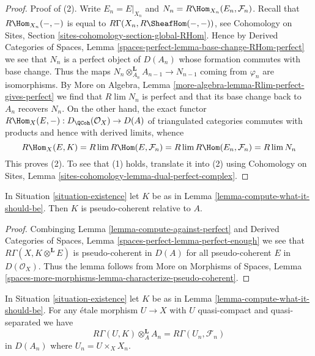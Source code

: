 \begin{proof}
Proof of (2). Write $E_n = E|_{X_n}$ and
$N_n = R\Hom_{X_n}(E_n, \mathcal{F}_n)$.
Recall that $R\Hom_{X_n}(-, -)$ is equal to
$R\Gamma(X_n, R\SheafHom(-, -))$, see
Cohomology on Sites, Section \ref{sites-cohomology-section-global-RHom}.
Hence by Derived Categories of Spaces, Lemma
\ref{spaces-perfect-lemma-base-change-RHom-perfect}
we see that $N_n$ is a perfect object of $D(A_n)$
whose formation commutes with base change. Thus the maps
$N_n \otimes_{A_n}^\mathbf{L} A_{n - 1} \to N_{n - 1}$
coming from $\varphi_n$ are isomorphisms.
By More on Algebra, Lemma \ref{more-algebra-lemma-Rlim-perfect-gives-perfect}
we find that $R\lim N_n$ is perfect and
that its base change back to $A_n$ recovers $N_n$.
On the other hand, the exact functor
$R\Hom_X(E, -) : D_\QCoh(\mathcal{O}_X) \to D(A)$
of triangulated categories commutes with products
and hence with derived limits, whence
$$
R\Hom_X(E, K) =
R\lim R\Hom(E, \mathcal{F}_n) =
R\lim R\Hom(E_n, \mathcal{F}_n) =
R\lim N_n
$$
This proves (2). To see that (1) holds, translate it into (2)
using Cohomology on Sites, Lemma
\ref{sites-cohomology-lemma-dual-perfect-complex}.
\end{proof}

\begin{lemma}
\label{lemma-relative-pseudo-coherence}
In Situation \ref{situation-existence} let $K$ be as in
Lemma \ref{lemma-compute-what-it-should-be}. Then $K$
is pseudo-coherent relative to $A$.
\end{lemma}

\begin{proof}
Combinging Lemma \ref{lemma-compute-against-perfect} and
Derived Categories of Spaces, Lemma \ref{spaces-perfect-lemma-perfect-enough}
we see that $R\Gamma(X, K \otimes^\mathbf{L} E)$
is pseudo-coherent in $D(A)$ for all pseudo-coherent
$E$ in $D(\mathcal{O}_X)$. Thus the lemma follows from
More on Morphisms of Spaces, Lemma
\ref{spaces-more-morphisms-lemma-characterize-pseudo-coherent}.
\end{proof}

\begin{lemma}
\label{lemma-compute-over-affine}
In Situation \ref{situation-existence} let $K$ be as in
Lemma \ref{lemma-compute-what-it-should-be}. For any
\'etale morphism $U \to X$ with $U$ quasi-compact and quasi-separated we have
$$
R\Gamma(U, K) \otimes_A^\mathbf{L} A_n =
R\Gamma(U_n, \mathcal{F}_n)
$$
in $D(A_n)$ where $U_n = U \times_X X_n$.
\end{lemma}

